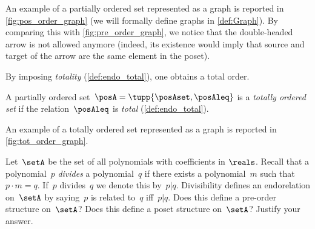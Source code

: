 \begin{marginfigure}
    \caption{}
    \label{fig:pos_order_graph}
\end{marginfigure}

An example of a partially ordered set represented as a graph is reported in \cref{fig:pos_order_graph} (we will formally define graphs in \cref{def:Graph}).
By comparing this with \cref{fig:pre_order_graph}, we notice that the double-headed arrow is not allowed anymore (indeed, its existence would imply that source and target of the arrow are the same element in the poset).

By imposing \emph{totality} (\cref{def:endo_total}), one obtains a total order.

\begin{ctdefinition}
    \label{def:total_order}
    A partially ordered set~$\posA = \tupp{\posAset,\posAleq}$ is a \emph{totally ordered set} if the relation~$\posAleq$ is \emph{total}
    (\cref{def:endo_total}).
\end{ctdefinition}

\begin{marginfigure}
    \centering
    \caption{}
    \label{fig:tot_order_graph}
\end{marginfigure}

An example of a totally ordered set represented as a graph is reported in \cref{fig:tot_order_graph}.


\begin{gradedexercise} 
    \label{ex:PolynomialDivisibility}
Let~$\setA$ be the set of all polynomials with coefficients in $\reals$.
  Recall that a polynomial~$p$ \emph{divides} a polynomial~$q$ if there exists a polynomial~$m$ such that~$p \cdot m = q$.
  If~$p$ divides~$q$ we denote this by~$p \vert q$.
  Divisibility defines an endorelation on~$\setA$ by saying~$p$ is related to~$q$ iff~$p \vert q$.
    Does this define a pre-order structure on~$\setA$?
    Does this define a poset structure on~$\setA$?
    Justify your answer.
\end{gradedexercise}


\vfill
\clearpage

